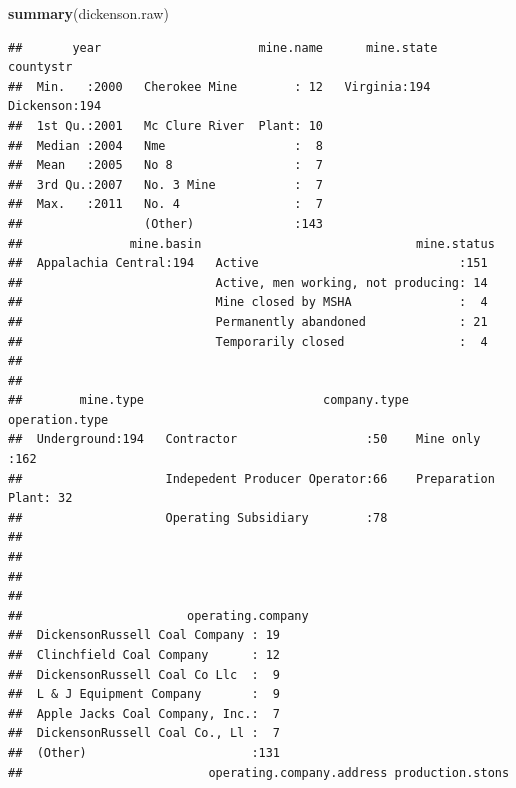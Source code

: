 \documentclass[12pt,]{article}
\newenvironment{Shaded}{\begin{snugshade}}{\end{snugshade}}
\newcommand{\KeywordTok}[1]{\textcolor[rgb]{0.13,0.29,0.53}{\textbf{#1}}}
\newcommand{\NormalTok}[1]{#1}
\begin{document}
\begin{Shaded}
\begin{Highlighting}[]
\KeywordTok{summary}\NormalTok{(dickenson.raw)}
\end{Highlighting}
\end{Shaded}

\begin{verbatim}
##       year                      mine.name      mine.state      countystr  
##  Min.   :2000   Cherokee Mine        : 12   Virginia:194   Dickenson:194  
##  1st Qu.:2001   Mc Clure River  Plant: 10                                 
##  Median :2004   Nme                  :  8                                 
##  Mean   :2005   No 8                 :  7                                 
##  3rd Qu.:2007   No. 3 Mine           :  7                                 
##  Max.   :2011   No. 4                :  7                                 
##                 (Other)              :143                                 
##               mine.basin                              mine.status 
##  Appalachia Central:194   Active                            :151  
##                           Active, men working, not producing: 14  
##                           Mine closed by MSHA               :  4  
##                           Permanently abandoned             : 21  
##                           Temporarily closed                :  4  
##                                                                   
##                                                                   
##        mine.type                         company.type           operation.type
##  Underground:194   Contractor                  :50    Mine only        :162   
##                    Indepedent Producer Operator:66    Preparation Plant: 32   
##                    Operating Subsidiary        :78                            
##                                                                               
##                                                                               
##                                                                               
##                                                                               
##                       operating.company
##  DickensonRussell Coal Company : 19    
##  Clinchfield Coal Company      : 12    
##  DickensonRussell Coal Co Llc  :  9    
##  L & J Equipment Company       :  9    
##  Apple Jacks Coal Company, Inc.:  7    
##  DickensonRussell Coal Co., Ll :  7    
##  (Other)                       :131    
##                          operating.company.address production.stons

\end{verbatim}
\end{document}
